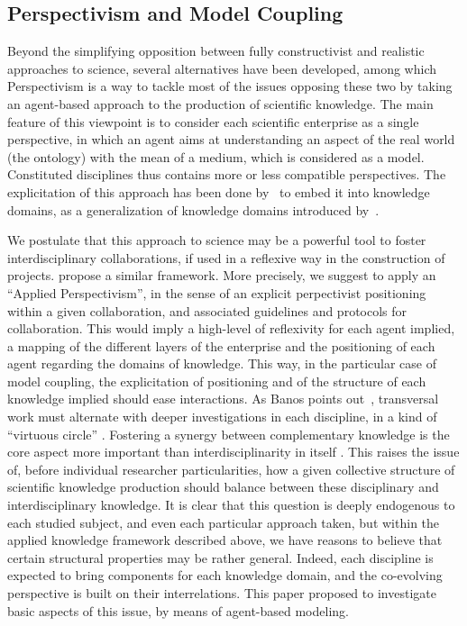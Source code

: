 \documentclass[utf8]{frontiersFPHY} %
\begin{document}
\subsection{Perspectivism and Model Coupling}

Beyond the simplifying opposition between fully constructivist and realistic approaches to science, several alternatives have been developed, among which Perspectivism \cite{giere2010scientific} is a way to tackle most of the issues opposing these two by taking an agent-based approach to the production of scientific knowledge. The main feature of this viewpoint is to consider each scientific enterprise as a single perspective, in which an agent aims at understanding an aspect of the real world (the ontology) with the mean of a medium, which is considered as a model. Constituted disciplines thus contains more or less compatible perspectives. The explicitation of this approach has been done by~\cite{raimbault2017knowledge} to embed it into knowledge domains, as a generalization of knowledge domains introduced by~\cite{livet2010ontology}.


We postulate that this approach to science may be a powerful tool to foster interdisciplinary collaborations, if used in a reflexive way in the construction of projects. \cite{Ellemers7561} propose a similar framework. More precisely, we suggest to apply an ``Applied Perspectivism'', in the sense of an explicit perpectivist positioning within a given collaboration, and associated guidelines and protocols for collaboration. This would imply a high-level of reflexivity for each agent implied, a mapping of the different layers of the enterprise and the positioning of each agent regarding the domains of knowledge. This way, in the particular case of model coupling, the explicitation of positioning and of the structure of each knowledge implied should ease interactions. As Banos points out~\cite{banos2013pour}, transversal work must alternate with deeper investigations in each discipline, in a kind of ``virtuous circle'' \cite{banos2017knowledge}. Fostering a synergy between complementary knowledge is the core aspect more important than interdisciplinarity in itself \cite{leydesdorff2020measurement}. This raises the issue of, before individual researcher particularities, how a given collective structure of scientific knowledge production should balance between these disciplinary and interdisciplinary knowledge. It is clear that this question is deeply endogenous to each studied subject, and even each particular approach taken, but within the applied knowledge framework described above, we have reasons to believe that certain structural properties may be rather general. Indeed, each discipline is expected to bring components for each knowledge domain, and the co-evolving perspective is built on their interrelations. This paper proposed to investigate basic aspects of this issue, by means of agent-based modeling.
\end{document}
